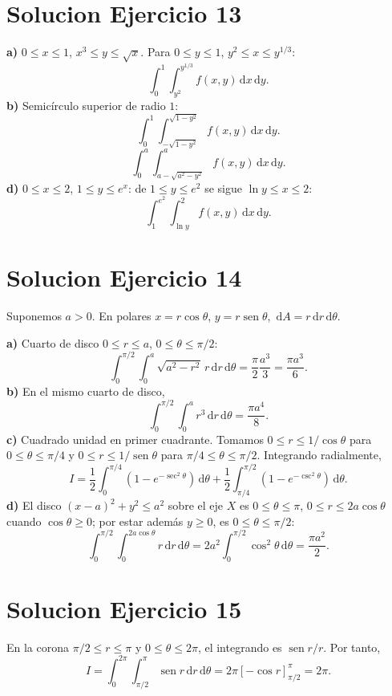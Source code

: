 \documentclass[11pt,a4paper]{article}
\DeclareMathOperator{\sen}{sen}
\newcommand{\dd}{\,\mathrm{d}}
\begin{document}
\section{Solucion Ejercicio 13}
\textbf{a)} $0\le x\le1$, $x^3\le y\le\sqrt{x}$. Para $0\le y\le1$, $y^2\le x\le y^{1/3}$:
\[\boxed{\int_0^1\int_{y^2}^{y^{1/3}}f(x,y)\dd x\dd y}.\]
\textbf{b)} Semicírculo superior de radio $1$:
\[\boxed{\int_0^1\int_{-\sqrt{1-y^2}}^{\sqrt{1-y^2}}f(x,y)\dd x\dd y}.\]
\[\boxed{\int_0^a\int_{a-\sqrt{a^2-y^2}}^a f(x,y)\dd x\dd y}.\]
\textbf{d)} $0\le x\le2$, $1\le y\le e^x$: de $1\le y\le e^2$ se sigue $\ln y\le x\le2$:
\[\boxed{\int_1^{e^2}\int_{\ln y}^{2}f(x,y)\dd x\dd y}.\]

\section{Solucion Ejercicio 14}
Suponemos $a>0$. En polares $x=r\cos\theta$, $y=r\sen\theta$, $\dd A=r\dd r\dd\theta$.

\textbf{a)} Cuarto de disco $0\le r\le a$, $0\le\theta\le\pi/2$:
\[\int_0^{\pi/2}\int_0^a\sqrt{a^2-r^2}\,r\dd r\dd\theta=\frac\pi2\frac{a^3}{3}=\boxed{\frac{\pi a^3}{6}}.\]
\textbf{b)} En el mismo cuarto de disco,
\[\int_0^{\pi/2}\int_0^a r^3\dd r\dd\theta=\boxed{\frac{\pi a^4}{8}}.\]
\textbf{c)} Cuadrado unidad en primer cuadrante. Tomamos $0\le r\le1/\cos\theta$ para $0\le\theta\le\pi/4$ y $0\le r\le1/\sen\theta$ para $\pi/4\le\theta\le\pi/2$. Integrando radialmente,
\[I=\frac12\int_0^{\pi/4}(1-e^{-\sec^2\theta})\dd\theta+\frac12\int_{\pi/4}^{\pi/2}(1-e^{-\csc^2\theta})\dd\theta.\]
\textbf{d)} El disco $(x-a)^2+y^2\le a^2$ sobre el eje $X$ es $0\le\theta\le\pi$, $0\le r\le2a\cos\theta$ cuando $\cos\theta\ge0$; por estar además $y\ge0$, es $0\le\theta\le\pi/2$:
\[\int_0^{\pi/2}\int_0^{2a\cos\theta}r\dd r\dd\theta=2a^2\int_0^{\pi/2}\cos^2\theta\dd\theta=\boxed{\frac{\pi a^2}{2}}.\]

\section{Solucion Ejercicio 15}
En la corona $\pi/2\le r\le\pi$ y $0\le\theta\le2\pi$, el integrando es $\sen r/r$. Por tanto,
\[I=\int_0^{2\pi}\int_{\pi/2}^{\pi}\sen r\dd r\dd\theta=2\pi[-\cos r]_{\pi/2}^{\pi}=\boxed{2\pi}.\]
\end{document}
